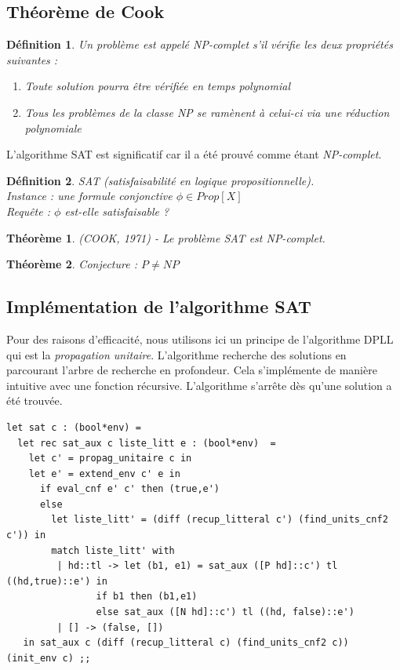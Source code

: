 \documentclass[11pt]{book}
\newtheorem{definition}{Définition}
\newtheorem{theoreme}{Théorème}
\begin{document}
\subsection{Théorème de Cook}
\begin{definition}
	Un problème est appelé NP-complet s'il vérifie les deux propriétés suivantes :
	\begin{enumerate}
		\item Toute solution pourra être vérifiée en temps polynomial
		\item Tous les problèmes de la classe NP se ramènent à celui-ci via une réduction polynomiale 
	\end{enumerate}
\end{definition}
L'algorithme SAT est significatif car il a été prouvé comme étant \textit{NP-complet}.
\begin{definition}
	SAT (satisfaisabilité en logique propositionnelle). \\
	Instance : une formule conjonctive $\phi \in Prop[X] $ \\
	Requête : $\phi$ est-elle satisfaisable ? 
\end{definition}
\begin{theoreme}
	(COOK, 1971) - Le problème SAT est NP-complet.
\end{theoreme}
\begin{theoreme}
Conjecture : $P\neq NP$
\end{theoreme}

\subsection{Implémentation de l'algorithme SAT}
Pour des raisons d'efficacité, nous utilisons ici un principe de l'algorithme DPLL qui est la \textit{propagation unitaire}.
L'algorithme recherche des solutions en parcourant l'arbre de recherche en profondeur. Cela s'implémente de manière
intuitive avec une fonction récursive. L'algorithme s'arrête dès qu'une solution a été trouvée.

\begin{Verbatim}
let sat c : (bool*env) =
  let rec sat_aux c liste_litt e : (bool*env)  = 
    let c' = propag_unitaire c in
    let e' = extend_env c' e in
      if eval_cnf e' c' then (true,e') 
      else 
        let liste_litt' = (diff (recup_litteral c') (find_units_cnf2 c')) in
        match liste_litt' with 
         | hd::tl -> let (b1, e1) = sat_aux ([P hd]::c') tl ((hd,true)::e') in
                if b1 then (b1,e1) 
                else sat_aux ([N hd]::c') tl ((hd, false)::e')
         | [] -> (false, [])
   in sat_aux c (diff (recup_litteral c) (find_units_cnf2 c)) (init_env c) ;;
\end{Verbatim}
\end{document}
